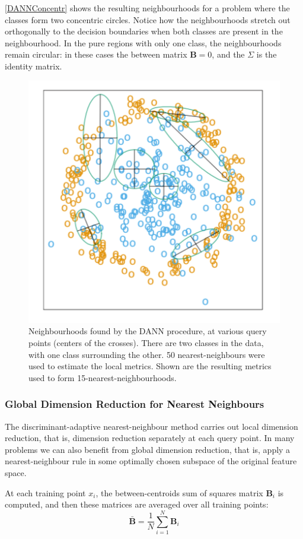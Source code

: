 \autoref{DANNConcentr} shows the resulting neighbourhoods for a problem where the classes form two concentric circles. Notice how the neighbourhoods stretch out orthogonally to the decision boundaries when both classes are present in the neighbourhood. In the pure regions with only one class, the neighbourhoods remain circular: in these cases the between matrix $\mathbf{B} = 0$, and the $\Sigma$ is the identity matrix.
\begin{figure}
\centering
\includegraphics[scale=0.7]{img/DANNConcentr}
\caption{Neighbourhoods found by the DANN procedure, at various query points (centers of the crosses). There are two classes in the data, with one class surrounding the other. 50 nearest-neighbours were used to estimate the local metrics. Shown are the resulting metrics used to form 15-nearest-neighbourhoods.}
\label{DANNConcentr}
\end{figure}

\subsubsection{Global Dimension Reduction for Nearest Neighbours}
The discriminant-adaptive nearest-neighbour method carries out local dimension reduction, that is, dimension reduction separately at each query point. In many problems we can also benefit from global dimension reduction, that is, apply a nearest-neighbour rule in some optimally chosen subspace of the original feature space.

At each training point $x_i$, the between-centroids sum of squares matrix $\mathbf{B}_i$ is computed, and then these matrices are averaged over all training points:
\begin{equation}
\bar{\mathbf{B}} = \frac{1}{N} \sum_{i=1}^N \mathbf{B}_i
\end{equation}

